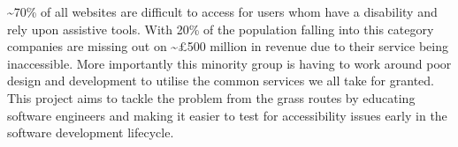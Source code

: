 \textasciitilde70\% of all websites are difficult to access for
users whom have a disability and rely upon assistive tools. With 20\% of the
population falling into this category companies are missing out
on \textasciitilde£500 million in revenue due to their service being
inaccessible. More importantly this minority group is having to work around
poor design and development to utilise the common services we all take for
granted. This project aims to tackle the problem from the grass routes by
educating software engineers and making it easier to test for accessibility
issues early in the software development lifecycle.
